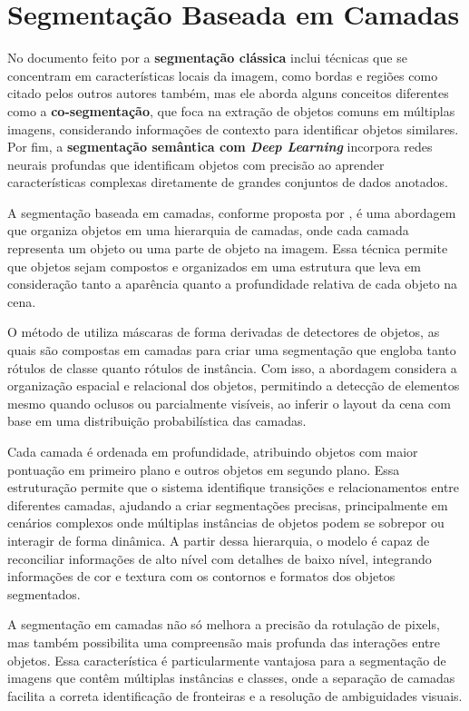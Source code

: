 \section{Segmentação Baseada em Camadas}

No documento feito por  a \textbf{segmentação clássica} inclui técnicas que se concentram em características locais da imagem, como bordas e regiões como citado pelos outros autores também, mas ele aborda alguns conceitos diferentes como a \textbf{co-segmentação}, que foca na extração de objetos comuns em múltiplas imagens, considerando informações de contexto para identificar objetos similares. Por fim, a \textbf{segmentação semântica com \textit{Deep Learning}} incorpora redes neurais profundas que identificam objetos com precisão ao aprender características complexas diretamente de grandes conjuntos de dados anotados.

A segmentação baseada em camadas, conforme proposta por , é uma abordagem que organiza objetos em uma hierarquia de camadas, onde cada camada representa um objeto ou uma parte de objeto na imagem. Essa técnica permite que objetos sejam compostos e organizados em uma estrutura que leva em consideração tanto a aparência quanto a profundidade relativa de cada objeto na cena.

O método de  utiliza máscaras de forma derivadas de detectores de objetos, as quais são compostas em camadas para criar uma segmentação que engloba tanto rótulos de classe quanto rótulos de instância. Com isso, a abordagem considera a organização espacial e relacional dos objetos, permitindo a detecção de elementos mesmo quando oclusos ou parcialmente visíveis, ao inferir o layout da cena com base em uma distribuição probabilística das camadas.

Cada camada é ordenada em profundidade, atribuindo objetos com maior pontuação em primeiro plano e outros objetos em segundo plano. Essa estruturação permite que o sistema identifique transições e relacionamentos entre diferentes camadas, ajudando a criar segmentações precisas, principalmente em cenários complexos onde múltiplas instâncias de objetos podem se sobrepor ou interagir de forma dinâmica. A partir dessa hierarquia, o modelo é capaz de reconciliar informações de alto nível com detalhes de baixo nível, integrando informações de cor e textura com os contornos e formatos dos objetos segmentados.

A segmentação em camadas não só melhora a precisão da rotulação de pixels, mas também possibilita uma compreensão mais profunda das interações entre objetos. Essa característica é particularmente vantajosa para a segmentação de imagens que contêm múltiplas instâncias e classes, onde a separação de camadas facilita a correta identificação de fronteiras e a resolução de ambiguidades visuais.


